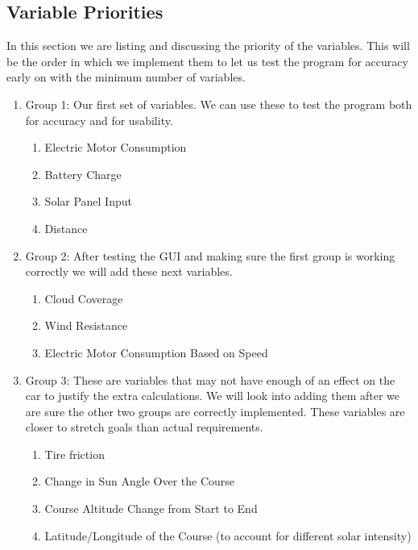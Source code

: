 \documentclass[onecolumn, draftclsnofoot,10pt, compsoc]{IEEEtran}
\begin{document}
    \subsection{Variable Priorities}
    In this section we are listing and discussing the priority of the variables. This will be the order in which we implement them to let us test the program for accuracy early on with the minimum number of variables.
    \begin{enumerate}
        \item Group 1: Our first set of variables. We can use these to test the program both for accuracy and for usability.
        \begin{enumerate}
            \item Electric Motor Consumption
            \item Battery Charge
            \item Solar Panel Input
            \item Distance
        \end{enumerate}
        \item Group 2: After testing the GUI and making sure the first group is working correctly we will add these next variables.
        \begin{enumerate}
            \item Cloud Coverage
            \item Wind Resistance
            \item Electric Motor Consumption Based on Speed
        \end{enumerate}
        \item Group 3: These are variables that may not have enough of an effect on the car to justify the extra calculations. We will look into adding them after we are sure the other two groups are correctly implemented. These variables are closer to stretch goals than actual requirements.
        \begin{enumerate}
            \item Tire friction
            \item Change in Sun Angle Over the Course
            \item Course Altitude Change from Start to End
            \item Latitude/Longitude of the Course (to account for different solar intensity)
        \end{enumerate}
    \end{enumerate}
    
\end{document}
